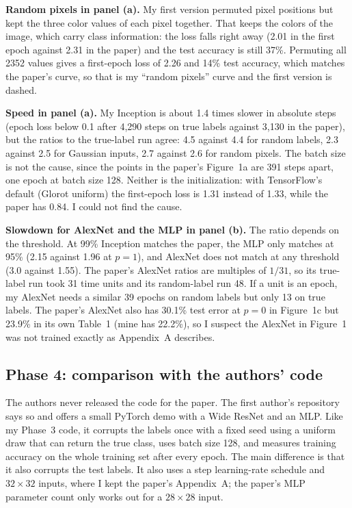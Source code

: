 \textbf{Random pixels in panel (a).} My first version permuted pixel positions but kept the three color values of each pixel together. That keeps the colors of the image, which carry class information: the loss falls right away (2.01 in the first epoch against 2.31 in the paper) and the test accuracy is still 37\%. Permuting all 2352 values gives a first-epoch loss of 2.26 and 14\% test accuracy, which matches the paper's curve, so that is my ``random pixels'' curve and the first version is dashed.

\textbf{Speed in panel (a).} My Inception is about 1.4 times slower in absolute steps (epoch loss below 0.1 after 4{,}290 steps on true labels against 3{,}130 in the paper), but the ratios to the true-label run agree: 4.5 against 4.4 for random labels, 2.3 against 2.5 for Gaussian inputs, 2.7 against 2.6 for random pixels. The batch size is not the cause, since the points in the paper's Figure~1a are 391 steps apart, one epoch at batch size 128. Neither is the initialization: with TensorFlow's default (Glorot uniform) the first-epoch loss is 1.31 instead of 1.33, while the paper has 0.84. I could not find the cause.

\textbf{Slowdown for AlexNet and the MLP in panel (b).} The ratio depends on the threshold. At 99\% Inception matches the paper, the MLP only matches at 95\% (2.15 against 1.96 at $p=1$), and AlexNet does not match at any threshold (3.0 against 1.55). The paper's AlexNet ratios are multiples of $1/31$, so its true-label run took 31 time units and its random-label run 48. If a unit is an epoch, my AlexNet needs a similar 39 epochs on random labels but only 13 on true labels. The paper's AlexNet also has 30.1\% test error at $p=0$ in Figure~1c but 23.9\% in its own Table~1 (mine has 22.2\%), so I suspect the AlexNet in Figure~1 was not trained exactly as Appendix~A describes.

\subsection{Phase 4: comparison with the authors' code}
The authors never released the code for the paper. The first author's repository  says so and offers a small PyTorch demo with a Wide ResNet and an MLP. Like my Phase~3 code, it corrupts the labels once with a fixed seed using a uniform draw that can return the true class, uses batch size 128, and measures training accuracy on the whole training set after every epoch. The main difference is that it also corrupts the test labels. It also uses a step learning-rate schedule and $32\times32$ inputs, where I kept the paper's Appendix~A; the paper's MLP parameter count only works out for a $28\times28$ input.

